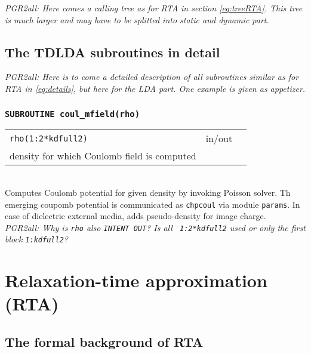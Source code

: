 \documentclass[final,1p]{elsarticle}
\newcommand{\PGRcomm}[1]{{\color{blue}\small\em PGR2all: #1}}
\begin{document}
\PGRcomm{Here comes a calling tree as for RTA in section
  \ref{eq:treeRTA}. This tree is much larger and may have to be
  splitted into static and dynamic part.
}

\subsection{The TDLDA subroutines in detail}
\label{eq:detailsTDLDA}


\PGRcomm{Here is to come a detailed description of all subroutines
  similar as for RTA in \ref{eq:details}, but here for the LDA part.
One example is given as appetizer.
}

\subsubsection*{\tt SUBROUTINE coul\_mfield(rho)}
\begin{tabular}{lcl}
 {\tt rho(1:2*kdfull2)} & in/out & \\ density for which Coulomb field
 is computed
\end{tabular}
\\[4pt]
Computes Coulomb potential for given density by invoking
Poisson solver.
Th emerging coupomb potential is communicated as {\tt chpcoul}
via module {\tt params}.
In case of dielectric external media, adds pseudo-density for image
charge.
\\
\PGRcomm{Why is {\tt rho} also {\tt INTENT OUT}? Is all {\tt
    1:2*kdfull2} used or only the first block {\tt 1:kdfull2}?}







\section{Relaxation-time approximation (RTA)}


\subsection{The formal background of RTA}
\end{document}
